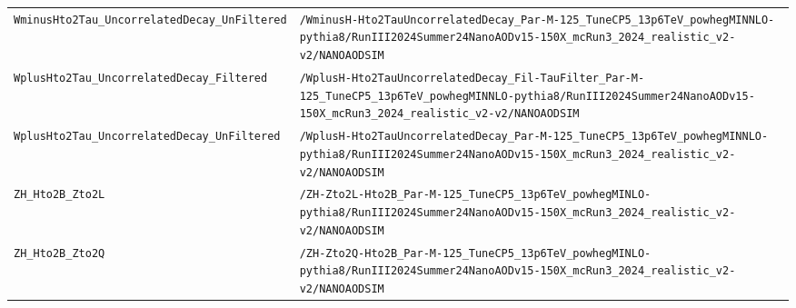 \begin{longtable}{@{}>{\RaggedRight\arraybackslash}p{} >{\RaggedRight\arraybackslash}p{}@{}}
\addlinespace[2pt]
\texttt{WminusHto2Tau\_\allowbreak{}UncorrelatedDecay\_\allowbreak{}UnFiltered} & \texttt{/\allowbreak{}WminusH-\allowbreak{}Hto2TauUncorrelatedDecay\_\allowbreak{}Par-\allowbreak{}M-\allowbreak{}125\_\allowbreak{}TuneCP5\_\allowbreak{}13p6TeV\_\allowbreak{}powhegMINNLO-\allowbreak{}pythia8/\allowbreak{}RunIII2024Summer24NanoAODv15-\allowbreak{}150X\_\allowbreak{}mcRun3\_\allowbreak{}2024\_\allowbreak{}realistic\_\allowbreak{}v2-\allowbreak{}v2/\allowbreak{}NANOAODSIM} \\
\addlinespace[2pt]
\texttt{WplusHto2Tau\_\allowbreak{}UncorrelatedDecay\_\allowbreak{}Filtered} & \texttt{/\allowbreak{}WplusH-\allowbreak{}Hto2TauUncorrelatedDecay\_\allowbreak{}Fil-\allowbreak{}TauFilter\_\allowbreak{}Par-\allowbreak{}M-\allowbreak{}125\_\allowbreak{}TuneCP5\_\allowbreak{}13p6TeV\_\allowbreak{}powhegMINNLO-\allowbreak{}pythia8/\allowbreak{}RunIII2024Summer24NanoAODv15-\allowbreak{}150X\_\allowbreak{}mcRun3\_\allowbreak{}2024\_\allowbreak{}realistic\_\allowbreak{}v2-\allowbreak{}v2/\allowbreak{}NANOAODSIM} \\
\addlinespace[2pt]
\texttt{WplusHto2Tau\_\allowbreak{}UncorrelatedDecay\_\allowbreak{}UnFiltered} & \texttt{/\allowbreak{}WplusH-\allowbreak{}Hto2TauUncorrelatedDecay\_\allowbreak{}Par-\allowbreak{}M-\allowbreak{}125\_\allowbreak{}TuneCP5\_\allowbreak{}13p6TeV\_\allowbreak{}powhegMINNLO-\allowbreak{}pythia8/\allowbreak{}RunIII2024Summer24NanoAODv15-\allowbreak{}150X\_\allowbreak{}mcRun3\_\allowbreak{}2024\_\allowbreak{}realistic\_\allowbreak{}v2-\allowbreak{}v2/\allowbreak{}NANOAODSIM} \\
\addlinespace[2pt]
\texttt{ZH\_\allowbreak{}Hto2B\_\allowbreak{}Zto2L} & \texttt{/\allowbreak{}ZH-\allowbreak{}Zto2L-\allowbreak{}Hto2B\_\allowbreak{}Par-\allowbreak{}M-\allowbreak{}125\_\allowbreak{}TuneCP5\_\allowbreak{}13p6TeV\_\allowbreak{}powhegMINLO-\allowbreak{}pythia8/\allowbreak{}RunIII2024Summer24NanoAODv15-\allowbreak{}150X\_\allowbreak{}mcRun3\_\allowbreak{}2024\_\allowbreak{}realistic\_\allowbreak{}v2-\allowbreak{}v2/\allowbreak{}NANOAODSIM} \\
\addlinespace[2pt]
\texttt{ZH\_\allowbreak{}Hto2B\_\allowbreak{}Zto2Q} & \texttt{/\allowbreak{}ZH-\allowbreak{}Zto2Q-\allowbreak{}Hto2B\_\allowbreak{}Par-\allowbreak{}M-\allowbreak{}125\_\allowbreak{}TuneCP5\_\allowbreak{}13p6TeV\_\allowbreak{}powhegMINLO-\allowbreak{}pythia8/\allowbreak{}RunIII2024Summer24NanoAODv15-\allowbreak{}150X\_\allowbreak{}mcRun3\_\allowbreak{}2024\_\allowbreak{}realistic\_\allowbreak{}v2-\allowbreak{}v2/\allowbreak{}NANOAODSIM} \\

\end{longtable}
